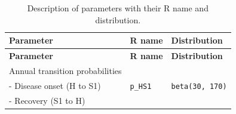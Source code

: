 \documentclass[]{book}
\begin{document}
\begin{longtable}[]{@{}lll@{}}
\caption{\label{tab:parameters-PSA} Description of parameters with their R name and distribution.}\tabularnewline
\toprule
\begin{minipage}[b]{0.33\columnwidth}\raggedright
\textbf{Parameter}\strut
\end{minipage} & \begin{minipage}[b]{0.13\columnwidth}\raggedright
\textbf{R name}\strut
\end{minipage} & \begin{minipage}[b]{0.46\columnwidth}\raggedright
\textbf{Distribution}\strut
\end{minipage}\tabularnewline
\midrule
\endfirsthead
\toprule
\begin{minipage}[b]{0.33\columnwidth}\raggedright
\textbf{Parameter}\strut
\end{minipage} & \begin{minipage}[b]{0.13\columnwidth}\raggedright
\textbf{R name}\strut
\end{minipage} & \begin{minipage}[b]{0.46\columnwidth}\raggedright
\textbf{Distribution}\strut
\end{minipage}\tabularnewline
\midrule
\endhead
\begin{minipage}[t]{0.33\columnwidth}\raggedright
Annual transition probabilities\strut
\end{minipage} & \begin{minipage}[t]{0.13\columnwidth}\raggedright
\strut
\end{minipage} & \begin{minipage}[t]{0.46\columnwidth}\raggedright
\strut
\end{minipage}\tabularnewline
\begin{minipage}[t]{0.33\columnwidth}\raggedright
- Disease onset (H to S1)\strut
\end{minipage} & \begin{minipage}[t]{0.13\columnwidth}\raggedright
\texttt{p\_HS1}\strut
\end{minipage} & \begin{minipage}[t]{0.46\columnwidth}\raggedright
\texttt{beta(30,\ 170)}\strut
\end{minipage}\tabularnewline
\begin{minipage}[t]{0.33\columnwidth}\raggedright
- Recovery (S1 to H)\strut
\end{minipage} & \begin{minipage}[t]{0.13\columnwidth}\raggedright

\end{minipage}
\end{longtable}
\end{document}
